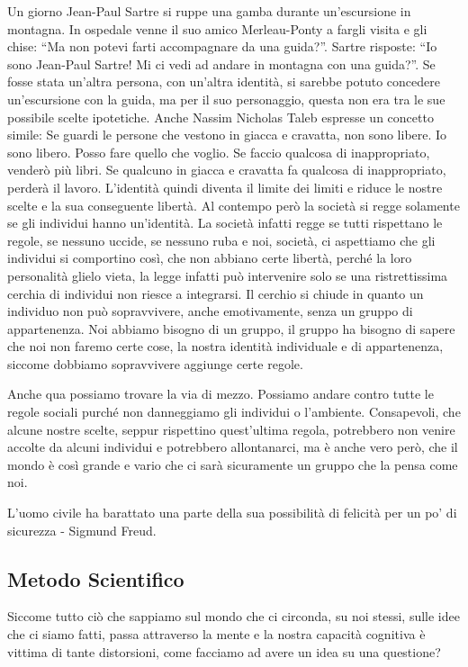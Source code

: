 \documentclass[12pt]{book} %
\begin{document}
\begin{mdframed}[linewidth=1pt]
Un giorno Jean-Paul Sartre si ruppe una gamba durante un'escursione in montagna. In ospedale venne
il suo amico Merleau-Ponty a fargli visita e gli chise: “Ma non potevi farti accompagnare da una guida?”. Sartre
risposte: “Io sono Jean-Paul Sartre! Mi ci vedi ad andare in montagna con una guida?”. Se fosse stata
un'altra persona, con un'altra identità, si sarebbe potuto concedere
un'escursione con la guida, ma per il suo personaggio, questa non era tra le sue possibile scelte
ipotetiche. 
Anche Nassim Nicholas Taleb espresse un concetto simile: Se guardi le persone che vestono in giacca e cravatta, non sono libere. Io sono libero. Posso fare quello che voglio. Se faccio qualcosa di inappropriato, venderò più libri. Se qualcuno in giacca e cravatta fa qualcosa di inappropriato, perderà il lavoro.
L'identità quindi diventa il limite dei limiti e riduce le nostre scelte e la sua
conseguente libertà. Al contempo però la società si regge solamente se gli individui hanno
un'identità. La società infatti regge se tutti rispettano le regole, se nessuno uccide, se nessuno
ruba e noi, società, ci aspettiamo che gli individui si comportino così, che non abbiano certe libertà, perché la loro
personalità glielo vieta, la legge infatti può intervenire solo se una ristrettissima cerchia di individui non riesce a
integrarsi. Il cerchio si chiude in quanto un individuo non può sopravvivere, anche emotivamente, senza un gruppo di
appartenenza. Noi abbiamo bisogno di un gruppo, il gruppo ha bisogno di sapere che noi non faremo certe cose, la nostra
identità individuale e di appartenenza, siccome dobbiamo sopravvivere aggiunge certe regole. 

Anche qua possiamo trovare la via di mezzo. Possiamo andare contro tutte le regole sociali purché non danneggiamo gli
individui o l'ambiente. Consapevoli, che alcune nostre scelte, seppur rispettino
quest'ultima regola, potrebbero non venire accolte da alcuni individui e potrebbero allontanarci,
ma è anche vero però, che il mondo è così grande e vario che ci sarà sicuramente un gruppo che la pensa come noi.

L'uomo civile ha barattato una parte della sua possibilità di felicità per un po' di sicurezza - Sigmund Freud.
\end{mdframed}

\subsection{Metodo Scientifico}
Siccome tutto ciò che sappiamo sul mondo che ci circonda, su noi stessi, sulle idee che ci siamo fatti, passa attraverso
la mente e la nostra capacità cognitiva è vittima di tante distorsioni, come facciamo ad avere un idea su una
questione?
\end{document}
